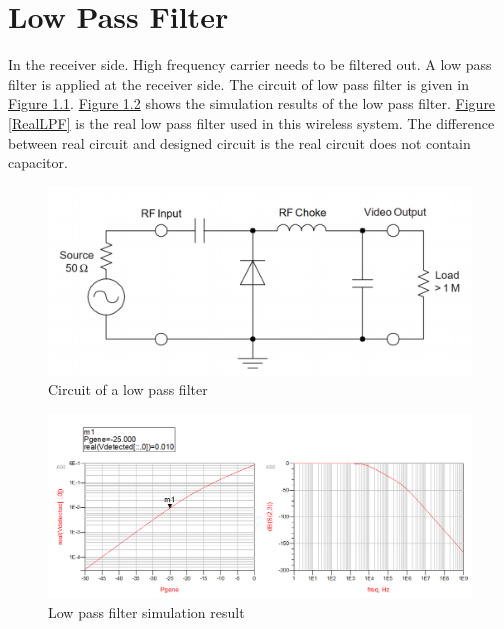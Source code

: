 \documentclass[12pt,a4paper]{report}
\begin{document}
\chapter{Low Pass Filter}
In the receiver side. High frequency carrier needs to be filtered out. A low pass filter is applied at the receiver side. The circuit of low pass filter is given in \hyperref[fig:typical_detector_circuit]{Figure \ref*{fig:typical_detector_circuit}}.
\hyperref[LPFSimulationResult]{Figure \ref*{LPFSimulationResult}} shows the simulation results of the low pass filter. \hyperref[RealLPF]{Figure \ref*{RealLPF}} is the real low pass filter used in this wireless system. The difference between real
circuit and designed circuit is the real circuit does not contain capacitor.
\begin{figure}[ht]
    \centerline{\includegraphics[scale=1]{typical_detector_circuit}}
    \caption{Circuit of a low pass filter}
    \label{fig:typical_detector_circuit}
\end{figure}

\begin{figure}[H]
    \centerline{\includegraphics[scale=0.5]{LPF_SimulationResult.PNG}}
    \caption{Low pass filter simulation result}
    \label{LPFSimulationResult}
\end{figure}
\end{document}
